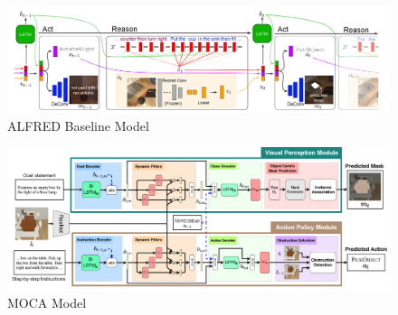 \documentclass[11pt,a4paper]{article}
\begin{document}
\begin{figure}
    \centering
    \includegraphics[scale=0.75]{figures/alfred_model.png}
    \caption{ALFRED Baseline Model \cite{shridhar2020alfred}}
    \label{fig:alfred_model}
\end{figure}

\begin{figure}
    \centering
    \includegraphics[scale=0.75]{figures/moca_model.png}
    \caption{MOCA Model \cite{singh2020moca}}
    \label{fig:moca_model}
\end{figure}

\end{document}
